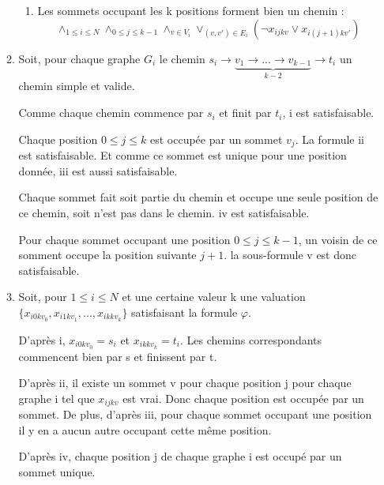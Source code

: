 \documentclass{article}
\begin{document}
\begin{enumerate}
\begin{enumerate}[label=(\alph*)]
\begin{enumerate}
    \item
    Les sommets occupant les k positions forment bien un chemin : \newline
    $$
        \land_{1 \le i \le N} \land_{0 \le j \le k - 1} \land_{v \in V_i} \lor_{(v, v') \in E_i} (\neg x_{ijkv} \lor x_{i (j + 1) kv'})
    $$
\end{enumerate}

\item

Soit, pour chaque graphe $G_i$ le chemin $s_i \rightarrow \underbrace{v_1 \rightarrow ... \rightarrow v_{k - 1}}_{k - 2} \rightarrow t_i$ un chemin simple et valide.

Comme chaque chemin commence par $s_i$ et finit par $t_i$, i est satisfaisable. \newline

Chaque position $0 \le j \le k$ est occupée par un sommet $v_j$. La formule ii est satisfaisable. Et comme ce sommet est unique pour une position donnée, iii est aussi satisfaisable. \newline

Chaque sommet fait soit partie du chemin et occupe une seule position de ce chemin, soit n'est pas dans le chemin. iv est satisfaisable.\newline

Pour chaque sommet occupant une position $0 \le j \le k - 1$, un voisin de ce somment occupe la position suivante $j + 1$. la sous-formule v est donc satisfaisable.

\item 

Soit, pour $1 \le i \le N$ et une certaine valeur k une valuation $\{x_{i 0 k v_0}, x_{i 1 k v_1}, ..., x_{i k k v_k}\}$ satisfaisant la formule $\varphi$.

D'après i, $x_{i 0 k v_0} = s_i$ et $x_{i k k v_k} = t_i$. Les chemins correspondants commencent bien par s et finissent par t. \newline

D'après ii, il existe un sommet v pour chaque position j pour chaque graphe i  tel que $x_{i j k v}$ est vrai. Donc chaque position est occupée par un sommet. De plus, d'après iii, pour chaque sommet occupant une position il y en a aucun autre occupant cette même position. \newline

D'après iv, chaque position j de chaque graphe i est occupé par un sommet unique.\newline


\end{enumerate}
\end{enumerate}
\end{document}
